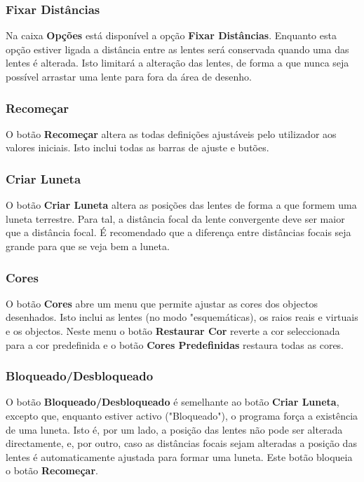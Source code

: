 \documentclass[a4paper,12pt]{article}
\begin{document}
\subsubsection{Fixar Distâncias}

Na caixa {\bf Opções} está disponível a opção {\bf Fixar Distâncias}. Enquanto esta opção estiver ligada a distância entre as lentes será conservada quando uma das lentes é alterada. Isto limitará a alteração das lentes, de forma a que nunca seja possível arrastar uma lente para fora da área de desenho.
\par

\subsubsection{Recomeçar}

O botão {\bf Recomeçar} altera as todas definições ajustáveis pelo utilizador aos valores iniciais. Isto inclui todas as barras de ajuste e butões.
\par

\subsubsection{Criar Luneta}

O botão {\bf Criar Luneta} altera as posições das lentes de forma a que formem uma luneta terrestre. Para tal, a distância focal da lente convergente deve ser maior que a distância focal. É recomendado que a diferença entre distâncias focais seja grande para que se veja bem a luneta.
\par

\subsubsection{Cores}

O botão {\bf Cores} abre um menu que permite ajustar as cores dos objectos desenhados. Isto  inclui as lentes (no modo "esquemáticas), os raios reais e virtuais e os objectos. Neste menu o botão {\bf Restaurar Cor} reverte a cor seleccionada para a cor predefinida e o botão {\bf Cores Predefinidas} restaura todas as cores.
\par

\subsubsection{Bloqueado/Desbloqueado}

O botão {\bf Bloqueado/Desbloqueado} é semelhante ao botão {\bf Criar Luneta}, excepto que, enquanto estiver activo ("Bloqueado"), o programa força a existência de uma luneta. Isto é, por um lado, a posição das lentes não pode ser alterada directamente, e, por outro, caso as distâncias focais sejam alteradas a posição das lentes é automaticamente ajustada para formar uma luneta. Este botão bloqueia o botão {\bf Recomeçar}.
\end{document}

